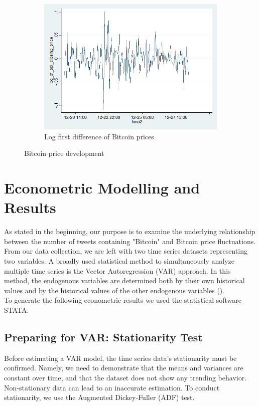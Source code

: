 \documentclass[a4paper,american,12pt]{article}
\begin{document}
\begin{spacing}{1.2}
\begin{figure}[H]
\begin{subfigure}{.3\textwidth}
	\includegraphics[width=1.12\textwidth]{stata_export_graphs/graph_plot_log_df_bpi.png}
	\caption{Log first difference of Bitcoin prices}
	\end{subfigure}
\caption{Bitcoin price development}
\end{figure}
	
\clearpage

\section{Econometric Modelling and Results}
\label{sec:EconometricModellingandResults}
As stated in the beginning, our purpose is to examine the underlying relationship between the number of tweets containing "Bitcoin" and Bitcoin price fluctuations. From our data collection, we are left with two time series datasets representing two variables. A broadly used statistical method to simultaneously analyze multiple time series is the Vector Autoregression (VAR) approach. In this method, the endogenous variables are determined both by their own historical values and by the historical values of the other endogenous variables (\cite[pp.~4--5]{luetkepohl2007new}).\\
To generate the following econometric results we used the statistical software STATA.

\subsection{Preparing for VAR: Stationarity Test}
Before estimating a VAR model, the time series data's stationarity must be confirmed. Namely, we need to demonstrate that the means and variances are constant over time, and that the dataset does not show any trending behavior. Non-stationary data can lead to an inaccurate estimation. To conduct stationarity, we use the Augmented Dickey-Fuller (ADF) test.\\


\end{spacing}
\end{document}
